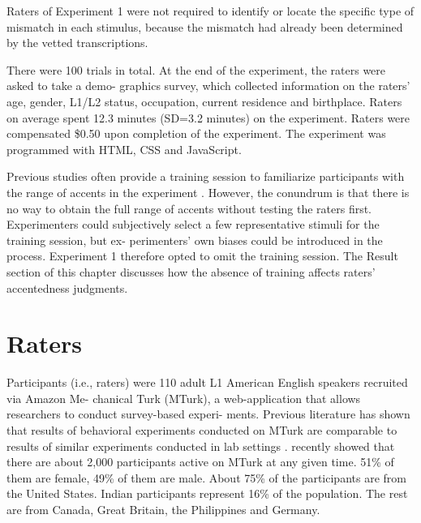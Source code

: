  Raters of Experiment 1 were not required to identify or locate the specific type of mismatch in each stimulus, because the mismatch had already been determined by the vetted transcriptions.

There were 100 trials in total. At the end of the experiment, the raters were asked to take a demo- graphics survey, which collected information on the raters’ age, gender, L1/L2 status, occupation, current residence and birthplace. Raters on average spent 12.3 minutes (SD=3.2 minutes) on the experiment. Raters were compensated \$0.50 upon completion of the experiment. The experiment was programmed with HTML, CSS and JavaScript.

Previous studies often provide a training session to familiarize participants with the range of accents in the experiment \citep{Major_1986, Munro_1999}. However, the conundrum is that there is no way to obtain the full range of accents without testing the raters first. Experimenters could subjectively select a few representative stimuli for the training session, but ex- perimenters’ own biases could be introduced in the process. Experiment 1 therefore opted to omit the training session. The Result section of this chapter discusses how the absence of training affects raters’ accentedness judgments.


\section{Raters}
\label{rater:1}
Participants (i.e., raters) were 110 adult L1 American English speakers recruited via Amazon Me- chanical Turk (MTurk), a web-application that allows researchers to conduct survey-based experi- ments. Previous literature has shown that results of behavioral experiments conducted on MTurk are comparable to results of similar experiments conducted in lab settings \citep{Enochson_2015, Sprouse_2010}. \citet{Difallah_2018} recently showed that there are about 2,000 participants active on MTurk at any given time. 51\% of them are female, 49\% of them are male. About 75\% of the participants are from the United States. Indian participants represent 16\% of the population. The rest are from Canada, Great Britain, the Philippines and Germany.

